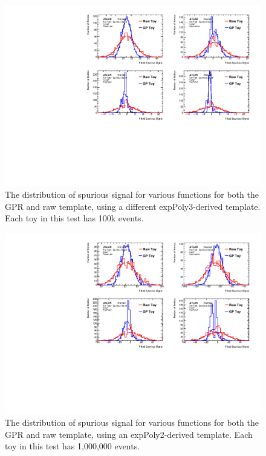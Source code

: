 \begin{figure} 
\begin{center}
  \includegraphics[width=\textwidth]{figures/background/gpr/validation/nominal/ToyTest_FitSigVals_highpT_100k_noSig}   
\caption{The distribution of spurious signal for various functions for both the GPR and raw template, using a different expPoly3-derived template. Each toy in this test has 100k events.}
\label{fig:highpt_100k_noSig}
\end{center}
\end{figure}

\begin{figure} 
\begin{center}
  \includegraphics[width=\textwidth]{figures/background/gpr/validation/nominal/ToyTest_FitSigVals_lowpT_1M_noSig}   
\caption{The distribution of spurious signal for various functions for both the GPR and raw template, using an expPoly2-derived template. Each toy in this test has 1,000,000 events.}
\label{fig:lowpt_1M_noSig}
\end{center}
\end{figure}

